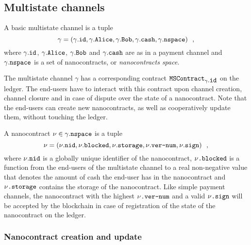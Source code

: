\subsection{Multistate channels}
  A basic multistate channel is a tuple
  \begin{equation*}
    \gamma = \left(\gamma\mbox{.\texttt{id}}, \gamma\mbox{.\texttt{Alice}},
    \gamma\mbox{.\texttt{Bob}}, \gamma\mbox{.\texttt{cash}},
    \gamma\mbox{.\texttt{nspace}}\right) \enspace,
  \end{equation*}
  where $\gamma\mbox{.\texttt{id}}$, $\gamma\mbox{.\texttt{Alice}}$,
  $\gamma\mbox{.\texttt{Bob}}$ and $\gamma\mbox{.\texttt{cash}}$ are as in a payment
  channel and $\gamma\mbox{.\texttt{nspace}}$ is a set of nanocontracts, or
  \textit{nanocontracts space}.

  The multistate channel $\gamma$ has a corresponding contract
  $\mbox{\texttt{MSContract}}_{\gamma\mbox{.\texttt{id}}}$ on the ledger. The end-users
  have to interact with this contract upon channel creation, channel closure and in case
  of dispute over the state of a nanocontract. Note that the end-users can create new
  nanocontracts, as well as cooperatively update them, without touching the ledger.

  A nanocontract $\nu \in \gamma\mbox{.\texttt{nspace}}$ is a tuple
  \begin{equation*}
    \nu = \left(\nu\mbox{.\texttt{nid}}, \nu\mbox{.\texttt{blocked}},
    \nu\mbox{.\texttt{storage}}, \nu\mbox{.\texttt{ver-num}},
    \nu\mbox{.\texttt{sign}}\right) \enspace,
  \end{equation*}
  where $\nu\mbox{.\texttt{nid}}$ is a globally unique identifier of the nanocontract,
  $\nu\mbox{\texttt{.blocked}}$ is a function from the end-users of the multistate channel
  to a real non-negative value that denotes the amount of cash the end-user has in the
  nanocontract and $\nu\mbox{\texttt{.storage}}$ contains the storage of the nanocontract.
  Like simple payment channels, the nanocontract with the highest
  $\nu\mbox{\texttt{.ver-num}}$ and a valid $\nu\mbox{\texttt{.sign}}$ will be accepted by
  the blockchain in case of registration of the state of the nanocontract on the ledger.

  \subsubsection{Nanocontract creation and update} \ \\

